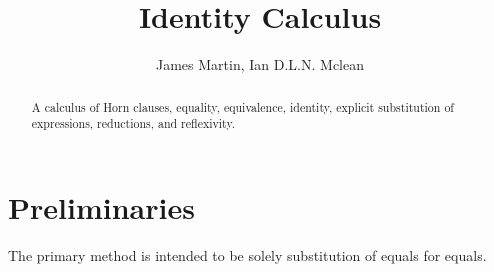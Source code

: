 \documentclass{article}
\author{James Martin, Ian D.L.N. Mclean}
\title{Identity Calculus}
\begin{document}
\maketitle

\begin{abstract}
A calculus of Horn clauses, equality, equivalence, identity, explicit substitution of expressions, reductions, and reflexivity.
\end{abstract}

\part{Preliminaries}
\begin{center}
	\begin{flushleft}
		The primary method is intended to be solely substitution of equals for equals.
	\end{flushleft}


\end{center}

\newpage
\end{document}

